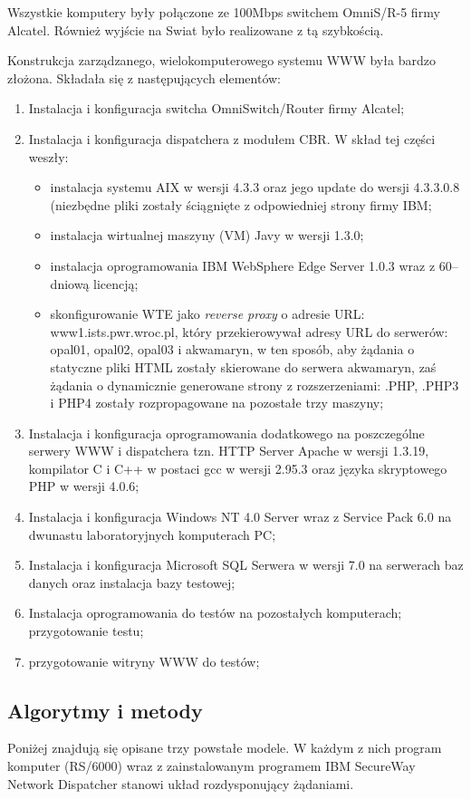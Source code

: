 Wszystkie komputery były połączone ze 100Mbps switchem OmniS/R-5 firmy Alcatel. Również wyjście na Swiat było realizowane z
tą szybkością. 

Konstrukcja zarządzanego, wielokomputerowego systemu WWW była bardzo złożona. Składała się z 
następujących elementów:
\begin{enumerate}
\item Instalacja i konfiguracja switcha OmniSwitch/Router firmy Alcatel;
\item Instalacja i konfiguracja dispatchera z modułem CBR. W skład tej części weszły: 
\begin{itemize}
\item instalacja systemu AIX w wersji 4.3.3 oraz jego update do wersji 4.3.3.0.8 (niezbędne pliki
zostały ściągnięte z odpowiedniej strony firmy IBM;
\item instalacja wirtualnej maszyny (VM) Javy w wersji 1.3.0;
\item instalacja oprogramowania IBM WebSphere Edge Server 1.0.3  wraz z 60--dniową licencją;
\item skonfigurowanie WTE jako \emph{reverse proxy } o adresie URL: www1.ists.pwr.wroc.pl, który
przekierowywał adresy URL do serwerów: opal01, opal02, opal03 i akwamaryn, w ten sposób, aby
żądania o statyczne pliki HTML zostały skierowane do serwera akwamaryn, zaś żądania o dynamicznie
generowane strony z rozszerzeniami: .PHP, .PHP3 i PHP4 zostały rozpropagowane na pozostałe
trzy maszyny;
\end{itemize}
\item Instalacja i konfiguracja oprogramowania dodatkowego na poszczególne serwery WWW i 
dispatchera tzn. HTTP Server Apache w wersji 1.3.19, kompilator C i C++ w postaci gcc w wersji
2.95.3 oraz języka skryptowego PHP w wersji 4.0.6;
\item Instalacja i konfiguracja Windows NT 4.0 Server wraz z Service Pack 6.0 na dwunastu
laboratoryjnych komputerach PC;
\item Instalacja i konfiguracja Microsoft SQL Serwera w wersji 7.0 na serwerach baz danych oraz
instalacja bazy testowej;
\item Instalacja oprogramowania do testów na pozostałych komputerach; przygotowanie testu;
\item przygotowanie witryny WWW do testów;
\end{enumerate}

\subsection{Algorytmy i metody}
Poniżej znajdują się opisane trzy powstałe modele. W każdym z nich program komputer (RS/6000) wraz z zainstalowanym programem 
IBM SecureWay Network Dispatcher stanowi układ rozdysponujący żądaniami. 

